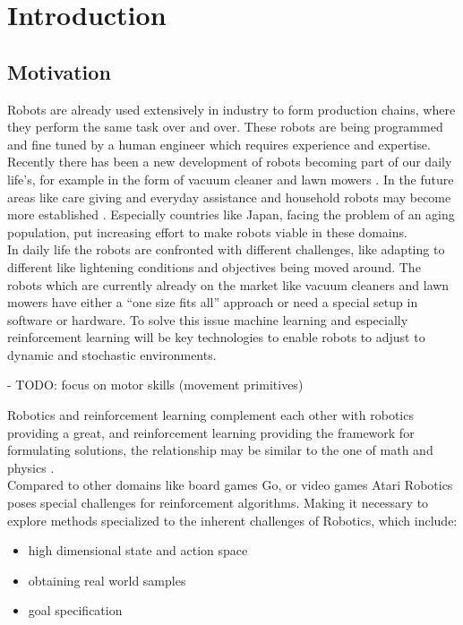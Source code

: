 
\chapter{Introduction}

\section{Motivation}
Robots are already used extensively in industry to form production chains,
where they perform the same task over and over.
These robots are being programmed and fine tuned
by a human engineer which requires experience and expertise. \\
Recently there has been a new development of robots
becoming part of our daily life's, for example in the form of 
vacuum cleaner and lawn mowers . In the future areas like care giving and
everyday assistance and household robots may
become more established \citet{schaal2007new}.
Especially countries like Japan, facing the problem of an
aging population, put increasing effort to make robots
viable in these domains.  \\
In daily life the robots are confronted with different challenges,
like  adapting to different like lightening conditions and
objectives being moved around.
The robots which are currently already on the market
like vacuum cleaners and lawn mowers have
either a ``one size fits all'' approach or need a special setup
in software or hardware. To solve this issue
machine learning and especially
reinforcement learning will be key technologies to enable robots
to adjust to dynamic and stochastic environments.

- TODO: focus on motor skills (movement primitives)

Robotics and reinforcement learning complement each other
with robotics providing a great, and reinforcement learning providing
the framework for formulating solutions, the 
relationship may be similar to the one of  math and physics
\citet{kober2013reinforcement}. \\
Compared to other domains like board games Go, or video games Atari
Robotics  poses special challenges for reinforcement algorithms. Making
it necessary to explore methods specialized to the inherent
challenges of Robotics, which include:

\begin{itemize}
\item high dimensional state and action space
\item obtaining real world samples
\item goal specification
\end{itemize}

